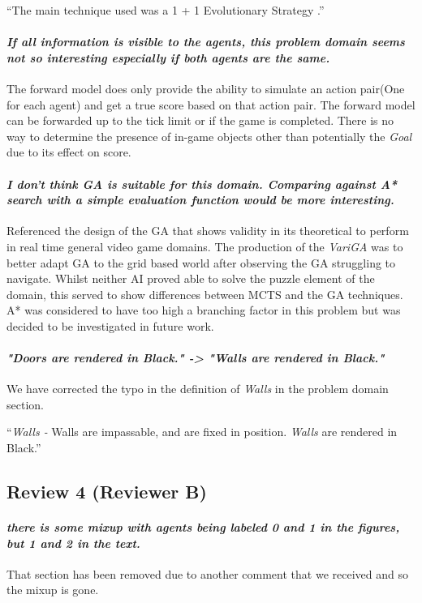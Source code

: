\documentclass{article}
\begin{document}
``The main technique used was a 1 + 1 Evolutionary Strategy \cite{t.back2000evolutionary-co}.''

\paragraph*{\textit{If all information is visible to the agents,
this problem domain seems not so interesting especially if
both agents are the same.}}
The forward model does only provide the ability to simulate an action pair(One for each agent) and get a true score based on that action pair. The forward model can be forwarded up to the tick limit or if the game is completed. There is no way to determine the presence of in-game objects other than potentially the \emph{Goal} due to its effect on score.
\paragraph*{\textit{I don't think GA is suitable for this domain.
Comparing against A* search with a simple evaluation function would be more interesting.}}
Referenced the design of the GA that shows validity in its theoretical to perform in real time general video game domains. The production of the \emph{VariGA} was to better adapt GA to the grid based world after observing the GA struggling to navigate. Whilst neither AI proved able to solve the puzzle element of the domain, this served to show differences between MCTS and the GA techniques. A* was considered to have too high a branching factor in this problem but was decided to be investigated in future work.

\paragraph*{\textit{"Doors are rendered in Black." -> "Walls are rendered in Black."}}
We have corrected the typo in the definition of \emph{Walls} in the problem domain section.

``\emph{Walls -} Walls are impassable, and are fixed in position. \emph{Walls} are rendered in Black.''
\subsection{Review 4 (Reviewer B)}
\paragraph*{\textit{there is some mixup with agents being labeled 0 and 1 in the figures, but 1 and 2 in the text.}}
That section has been removed due to another comment that we received and so the mixup is gone.
\end{document}
